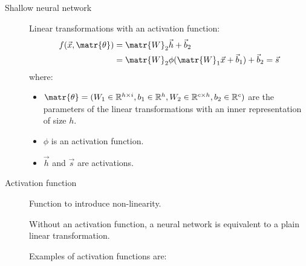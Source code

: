 \begin{description}    
    \item[Shallow neural network] 
        Linear transformations with an activation function:
        \[ 
            \begin{split}
                f(\vec{x}, \matr{\theta}) &= \matr{W}_2 \vec{h} + \vec{b}_2  \\
                &= \matr{W}_2 \phi(\matr{W}_1 \vec{x} + \vec{b}_1) + \vec{b}_2 = \vec{s}
            \end{split}
        \]
        where:
            \begin{itemize}
                \item $\matr{\theta} = (W_1 \in \mathbb{R}^{h \times i}, b_1 \in \mathbb{R}^{h}, W_2 \in \mathbb{R}^{c \times h}, b_2 \in \mathbb{R}^{c})$
                    are the parameters of the linear transformations with an inner representation of size $h$.
                \item $\phi$ is an activation function.
                \item $\vec{h}$ and $\vec{s}$ are activations.
            \end{itemize}

    \item[Activation function] 
        Function to introduce non-linearity.

        \begin{remark}
            Without an activation function, a neural network is equivalent to a plain linear transformation.
        \end{remark}

        Examples of activation functions are:
\end{description}

